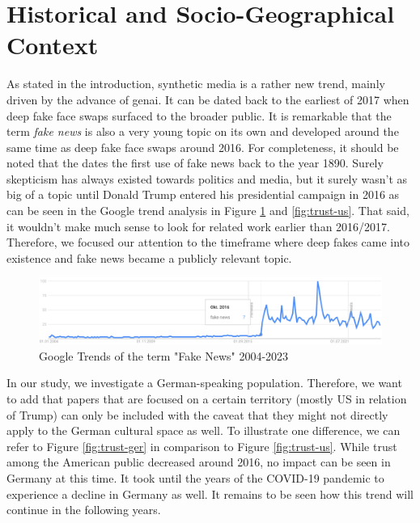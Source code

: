 \documentclass[
  a4paper,  %
  twoside,  %
  bibliography=totoc,
  headsepline,
  cleardoublepage=empty,
  parskip=half,
  draft=false
]{scrbook}
\begin{document}
\section{Historical and Socio-Geographical Context}
\label{sec:hist-context}
As stated in the introduction, synthetic media is a rather new trend, mainly driven by the advance of \gls{genai}. It can be dated back to the earliest of 2017 when deep fake face swaps surfaced to the broader public. It is remarkable that the term \textit{fake news} is also a very young topic on its own and developed around the same time as deep fake face swaps around 2016. For completeness, it should be noted that the \citet{merriam-websterdictionaryRealStoryFake} dates the first use of fake news back to the year 1890. Surely skepticism has always existed towards politics and media, but it surely wasn't as big of a topic until Donald Trump entered his presidential campaign in 2016 as can be seen in the Google trend analysis in Figure \ref{fig:gtrend-fake-news} and \ref{fig:trust-us}. That said, it wouldn't make much sense to look for related work earlier than 2016/2017. Therefore, we focused our attention to the timeframe where deep fakes came into existence and fake news became a publicly relevant topic.
\begin{figure}[h]
  \centering
  \includegraphics[width=1\textwidth]{./graphics/images/gtrends_fakenews_1011-2311.png}
  \caption{Google Trends of the term "Fake News" 2004-2023}
  \label{fig:gtrend-fake-news}
\end{figure}
In our study, we investigate a German-speaking population. Therefore, we want to add that papers that are focused on a certain territory (mostly US in relation of Trump) can only be included with the caveat that they might not directly apply to the German cultural space as well. To illustrate one difference, we can refer to Figure \ref{fig:trust-ger} in comparison to Figure \ref{fig:trust-us}. While trust among the American public decreased around 2016, no impact can be seen in Germany at this time. It took until the years of the COVID-19 pandemic to experience a decline in Germany as well. It remains to be seen how this trend will continue in the following years.
\end{document}
